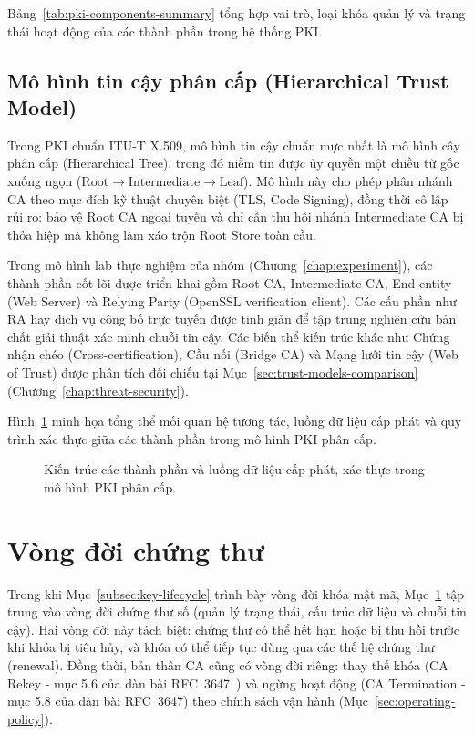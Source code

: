 Bảng~\ref{tab:pki-components-summary} tổng hợp vai trò, loại khóa quản lý và trạng thái hoạt động của các thành phần trong hệ thống PKI.



\subsection{Mô hình tin cậy phân cấp (Hierarchical Trust Model)}
\label{subsec:hierarchical-trust-model}

Trong PKI chuẩn ITU-T X.509, mô hình tin cậy chuẩn mực nhất là mô hình cây phân cấp (Hierarchical Tree), trong đó niềm tin được ủy quyền một chiều từ gốc xuống ngọn ($\mathrm{Root} \rightarrow \mathrm{Intermediate} \rightarrow \mathrm{Leaf}$). Mô hình này cho phép phân nhánh CA theo mục đích kỹ thuật chuyên biệt (TLS, Code Signing), đồng thời cô lập rủi ro: bảo vệ Root CA ngoại tuyến và chỉ cần thu hồi nhánh Intermediate CA bị thỏa hiệp mà không làm xáo trộn Root Store toàn cầu.

Trong mô hình lab thực nghiệm của nhóm (Chương~\ref{chap:experiment}), các thành phần cốt lõi được triển khai gồm Root CA, Intermediate CA, End-entity (Web Server) và Relying Party (OpenSSL verification client). Các cấu phần như RA hay dịch vụ công bố trực tuyến được tinh giản để tập trung nghiên cứu bản chất giải thuật xác minh chuỗi tin cậy. Các biến thể kiến trúc khác như Chứng nhận chéo (Cross-certification), Cầu nối (Bridge CA) và Mạng lưới tin cậy (Web of Trust) được phân tích đối chiếu tại Mục~\ref{sec:trust-models-comparison} (Chương~\ref{chap:threat-security}).

Hình~\ref{fig:pki-architecture-components} minh họa tổng thể mối quan hệ tương tác, luồng dữ liệu cấp phát và quy trình xác thực giữa các thành phần trong mô hình PKI phân cấp.

\begin{figure}[!htbp]
\centering

\caption{Kiến trúc các thành phần và luồng dữ liệu cấp phát, xác thực trong mô hình PKI phân cấp.}
\label{fig:pki-architecture-components}
\end{figure}
 
\section{Vòng đời chứng thư}
\label{sec:certificate-lifecycle}
Trong khi Mục~\ref{subsec:key-lifecycle} trình bày vòng đời khóa mật mã, Mục~\ref{sec:certificate-lifecycle} tập trung vào vòng đời chứng thư số (quản lý trạng thái, cấu trúc dữ liệu và chuỗi tin cậy). Hai vòng đời này tách biệt: chứng thư có thể hết hạn hoặc bị thu hồi trước khi khóa bị tiêu hủy, và khóa có thể tiếp tục dùng qua các thế hệ chứng thư (renewal). Đồng thời, bản thân CA cũng có vòng đời riêng: thay thế khóa (CA Rekey - mục 5.6 của dàn bài RFC~3647~\cite{rfc3647}) và ngừng hoạt động (CA Termination - mục 5.8 của dàn bài RFC~3647) theo chính sách vận hành (Mục~\ref{sec:operating-policy}).

